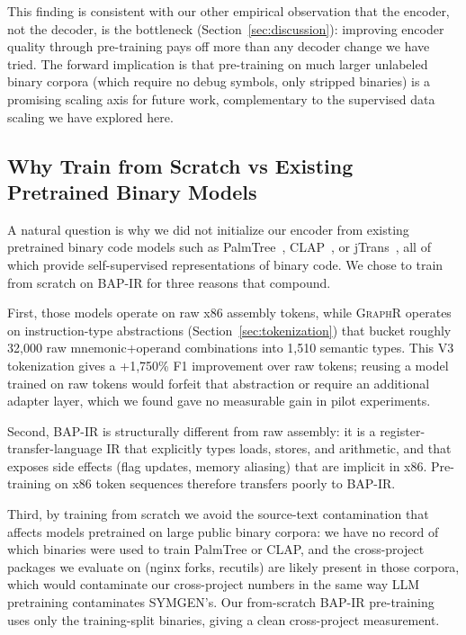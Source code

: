 \documentclass[sigconf,nonacm]{acmart}
\newcommand{\sysname}{\textsc{GraphR}}
\begin{document}
This finding is consistent with our other empirical observation that the encoder, not the decoder, is the bottleneck (Section~\ref{sec:discussion}): improving encoder quality through pre-training pays off more than any decoder change we have tried. The forward implication is that pre-training on much larger unlabeled binary corpora (which require no debug symbols, only stripped binaries) is a promising scaling axis for future work, complementary to the supervised data scaling we have explored here.

\subsection{Why Train from Scratch vs Existing Pretrained Binary Models}
\label{sec:scratch-vs-pretrained}

A natural question is why we did not initialize our encoder from existing pretrained binary code models such as PalmTree~\cite{palmtree}, CLAP~\cite{clap}, or jTrans~\cite{jtrans}, all of which provide self-supervised representations of binary code. We chose to train from scratch on BAP-IR for three reasons that compound.

First, those models operate on raw x86 assembly tokens, while \sysname{} operates on instruction-type abstractions (Section~\ref{sec:tokenization}) that bucket roughly 32{,}000 raw mnemonic+operand combinations into 1{,}510 semantic types. This V3 tokenization gives a +1{,}750\% F1 improvement over raw tokens; reusing a model trained on raw tokens would forfeit that abstraction or require an additional adapter layer, which we found gave no measurable gain in pilot experiments.

Second, BAP-IR is structurally different from raw assembly: it is a register-transfer-language IR that explicitly types loads, stores, and arithmetic, and that exposes side effects (flag updates, memory aliasing) that are implicit in x86. Pre-training on x86 token sequences therefore transfers poorly to BAP-IR.

Third, by training from scratch we avoid the source-text contamination that affects models pretrained on large public binary corpora: we have no record of which binaries were used to train PalmTree or CLAP, and the cross-project packages we evaluate on (nginx forks, recutils) are likely present in those corpora, which would contaminate our cross-project numbers in the same way LLM pretraining contaminates SYMGEN's. Our from-scratch BAP-IR pre-training uses only the training-split binaries, giving a clean cross-project measurement.
\end{document}
